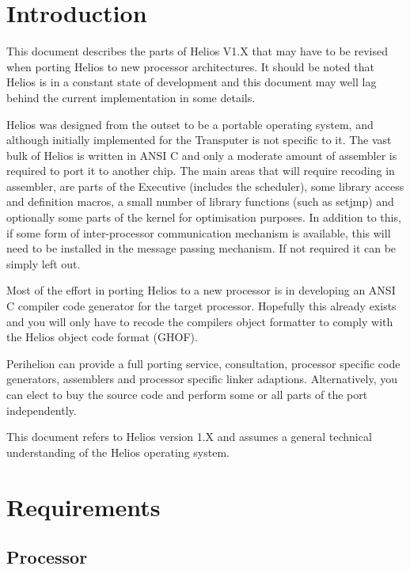 
\section{Introduction}

This document describes the parts of Helios V1.X that may have to be
revised when porting Helios to new processor architectures. It should be
noted that Helios is in a constant state of development and this document
may well lag behind the current implementation in some details.

Helios was designed from the outset to be a portable operating system, and 
although initially implemented for the Transputer is not specific to it.
The vast bulk of Helios is written in ANSI C and only a
moderate amount of assembler is required to port it to another chip.
The main areas that will require recoding in assembler, are parts of the
Executive (includes the scheduler), some library access and definition macros,
a small number of library functions (such as setjmp)
and optionally some parts of the kernel for optimisation purposes.
In addition to this, if some form of inter-processor communication mechanism is
available, this will need to be installed in the message passing mechanism.
If not required it can be simply left out.

Most of the effort in porting Helios to a new processor is in
developing an ANSI C compiler code generator for the target processor.
Hopefully this already exists and you will only have to recode the compilers
object formatter to comply with the Helios object code format (GHOF).

Perihelion can provide a full porting service, consultation, processor
specific code generators, assemblers and processor specific linker adaptions.
Alternatively, you can elect to buy the source code and perform some or all
parts of the port independently.

This document refers to Helios version 1.X and assumes a general technical
understanding of the Helios operating system.

\section{Requirements}

\subsection{Processor}

